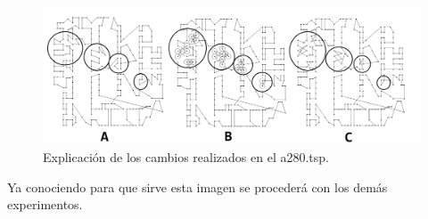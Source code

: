 \begin{figure}[hbtp]
    \centering
        \includegraphics[width=1\textwidth]{PruebasResultados/Imagenes/a280_explicado.png}
        \caption{Explicación de los cambios realizados en el a280.tsp.}
        \label{fig:a280_explicado.png}
\end{figure}

\hspace*{1cm}Ya conociendo para que sirve esta imagen se procederá con los demás experimentos.

\newpage

